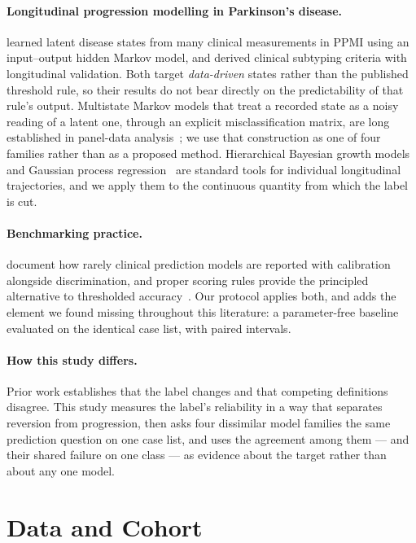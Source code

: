 \documentclass[11pt]{article}
\begin{document}
\paragraph{Longitudinal progression modelling in Parkinson's disease.}
\citet{severson2021} learned latent disease states from many clinical
measurements in PPMI using an input--output hidden Markov model, and
\citet{fereshtehnejad2017} derived clinical subtyping criteria with longitudinal
validation. Both target \emph{data-driven} states rather than the published
threshold rule, so their results do not bear directly on the predictability of
that rule's output. Multistate Markov models that treat a recorded state as a
noisy reading of a latent one, through an explicit misclassification matrix, are
long established in panel-data analysis~\citep{jackson2011}; we use that
construction as one of four families rather than as a proposed method.
Hierarchical Bayesian growth models and Gaussian process
regression~\citep{rasmussen2006} are standard tools for individual longitudinal
trajectories, and we apply them to the continuous quantity from which the label
is cut.

\paragraph{Benchmarking practice.}
\citet{vancalster2019} document how rarely clinical prediction models are
reported with calibration alongside discrimination, and proper scoring rules
provide the principled alternative to thresholded
accuracy~\citep{gneiting2007}. Our protocol applies both, and adds the element
we found missing throughout this literature: a parameter-free baseline evaluated
on the identical case list, with paired intervals.

\paragraph{How this study differs.}
Prior work establishes that the label changes and that competing definitions
disagree. This study measures the label's reliability in a way that separates
reversion from progression, then asks four dissimilar model families the same
prediction question on one case list, and uses the agreement among them --- and
their shared failure on one class --- as evidence about the target rather than
about any one model.

\section{Data and Cohort}
\label{sec:data}
\end{document}
